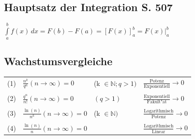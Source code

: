 		
		\subsection{Hauptsatz der Integration S. 507}
		$\int \limits_a^b f(x) \, dx = F(b) - F(a) = \left[ F(x) \right]_a^b = F(x) \vert_a^b $
			
	
	
	\subsection{Wachstumsvergleiche}			 
			\begin{tabular}{llll}
			(1) & $\frac{n^k}{q^n} (n \rightarrow \infty)= 0$  & (k $\in \mathbb{N}; q > 1)$ & $\frac{\text{Potenz}}{\text{Exponentiell}} \rightarrow 0$\\
			\\
			(2) & $\frac{q^n}{n!} (n \rightarrow \infty)= 0$ & $(q > 1)$ & $\frac{\text{Exponentiell}}{\text{Fakult"at}} \rightarrow 0$ \\
			\\
			(3) & $\frac{\ln(n)}{n^k} (n \rightarrow \infty)= 0$ & (k $\in \mathbb{N})$ & $\frac{\text{Logarithmisch}}{\text{Potenz}} \rightarrow 0$ \\
			\\
			(4) & $\frac{\ln(n)}{n} (n \rightarrow \infty)= 0$ & & $\frac{\text{Logarithmisch}}{\text{Linear}} \rightarrow 0$ \\
			\end{tabular}